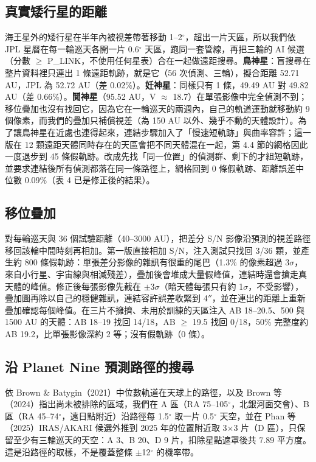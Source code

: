 \documentclass[twocolumn]{aastex631}
\begin{document}
\subsection{真實矮行星的距離}
海王星外的矮行星在半年內被視差帶著移動 1--2$^\circ$，超出一片天區，所以我們依 JPL 星曆在每一輪巡天各開一片 0.6$^\circ$ 天區，跑同一套管線，再把三輪的 AI 候選（分數 $\ge$ P\_LINK，不使用任何星表）合在一起做遠距搜尋。\textbf{鳥神星}：盲搜尋在整片資料裡只連出 1 條遠距軌跡，就是它（56 次偵測、三輪），擬合距離 52.71 AU，JPL 為 52.72 AU（差 0.02\%）。\textbf{妊神星}：同樣只有 1 條，49.49 AU 對 49.82 AU（差 0.66\%）。\textbf{鬩神星}（95.52 AU，V $\approx$ 18.7）在單張影像中完全偵測不到；移位疊加也沒有找回它，因為它在一輪巡天的兩週內，自己的軌道運動就移動約 9 個像素，而我們的疊加只補償視差（為 150 AU 以外、幾乎不動的天體設計）。為了讓鳥神星在近處也連得起來，連結步驟加入了「慢速短軌跡」與曲率容許；這一版在 12 顆遠距天體同時存在的天區會把不同天體混在一起，第 4.4 節的網格因此一度退步到 45 條假軌跡。改成先找「同一位置」的偵測群、剩下的才組短軌跡，並要求連結後所有偵測都落在同一條路徑上，網格回到 0 條假軌跡、距離誤差中位數 0.09\%（表 4 已是修正後的結果）。

\subsection{移位疊加}
對每輪巡天與 36 個試驗距離（40--3000 AU），把差分 S/N 影像沿預測的視差路徑移回該輪中間時刻再相加。第一版直接相加 S/N，注入測試只找回 3/36 顆，並產生約 800 條假軌跡：單張差分影像的雜訊有很重的尾巴（1.3\% 的像素超過 3$\sigma$，來自小行星、宇宙線與相減殘差），疊加後會堆成大量假峰值，連結時還會搶走真天體的峰值。修正後每張影像先截在 $\pm$3$\sigma$（暗天體每張只有約 1$\sigma$，不受影響），疊加圖再除以自己的穩健雜訊，連結容許誤差收緊到 4$''$，並在連出的距離上重新疊加確認每個峰值。在三片不擁擠、未用於訓練的天區注入 AB 18--20.5、500 與 1500 AU 的天體：AB 18--19 找回 14/18，AB $\ge$ 19.5 找回 0/18，50\% 完整度約 AB 19.2，比單張影像深約 2 等；沒有假軌跡（0 條）。

\subsection{沿 Planet Nine 預測路徑的搜尋}
依 Brown \& Batygin（2021）中位數軌道在天球上的路徑，以及 Brown 等（2024）指出尚未被排除的區域，我們在 A 區（RA 75--105$^\circ$，北銀河面交會）、B 區（RA 45--74$^\circ$，遠日點附近）沿路徑每 1.5$^\circ$ 取一片 0.5$^\circ$ 天空，並在 Phan 等（2025）IRAS/AKARI 候選外推到 2025 年的位置附近取 3$\times$3 片（D 區），只保留至少有三輪巡天的天空：A 3、B 20、D 9 片，扣除星點遮罩後共 7.89 平方度。這是沿路徑的取樣，不是覆蓋整條 $\pm$12$^\circ$ 的機率帶。
\end{document}
